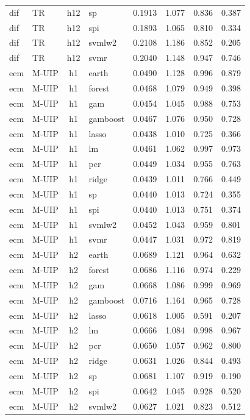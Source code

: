 \begin{ThreePartTable}
\begin{longtable}[t]{llclcccc}
dif & TR & h12 & sp & 0.1913 & 1.077 & 0.836 & 0.387\\
dif & TR & h12 & spi & 0.1893 & 1.065 & 0.810 & 0.334\\
dif & TR & h12 & svmlw2 & 0.2108 & 1.186 & 0.852 & 0.205\\
dif & TR & h12 & svmr & 0.2040 & 1.148 & 0.947 & 0.746\\
\addlinespace
ecm & M-UIP & h1 & earth & 0.0490 & 1.128 & 0.996 & 0.879\\
ecm & M-UIP & h1 & forest & 0.0468 & 1.079 & 0.949 & 0.398\\
ecm & M-UIP & h1 & gam & 0.0454 & 1.045 & 0.988 & 0.753\\
ecm & M-UIP & h1 & gamboost & 0.0467 & 1.076 & 0.950 & 0.728\\
ecm & M-UIP & h1 & lasso & 0.0438 & 1.010 & 0.725 & 0.366\\
ecm & M-UIP & h1 & lm & 0.0461 & 1.062 & 0.997 & 0.973\\
ecm & M-UIP & h1 & pcr & 0.0449 & 1.034 & 0.955 & 0.763\\
ecm & M-UIP & h1 & ridge & 0.0439 & 1.011 & 0.766 & 0.449\\
ecm & M-UIP & h1 & sp & 0.0440 & 1.013 & 0.724 & 0.355\\
ecm & M-UIP & h1 & spi & 0.0440 & 1.013 & 0.751 & 0.374\\
ecm & M-UIP & h1 & svmlw2 & 0.0452 & 1.043 & 0.959 & 0.801\\
ecm & M-UIP & h1 & svmr & 0.0447 & 1.031 & 0.972 & 0.819\\
\addlinespace
ecm & M-UIP & h2 & earth & 0.0689 & 1.121 & 0.964 & 0.632\\
ecm & M-UIP & h2 & forest & 0.0686 & 1.116 & 0.974 & 0.229\\
ecm & M-UIP & h2 & gam & 0.0668 & 1.086 & 0.999 & 0.969\\
ecm & M-UIP & h2 & gamboost & 0.0716 & 1.164 & 0.965 & 0.728\\
ecm & M-UIP & h2 & lasso & 0.0618 & 1.005 & 0.591 & 0.207\\
ecm & M-UIP & h2 & lm & 0.0666 & 1.084 & 0.998 & 0.967\\
ecm & M-UIP & h2 & pcr & 0.0650 & 1.057 & 0.962 & 0.800\\
ecm & M-UIP & h2 & ridge & 0.0631 & 1.026 & 0.844 & 0.493\\
ecm & M-UIP & h2 & sp & 0.0681 & 1.107 & 0.919 & 0.190\\
ecm & M-UIP & h2 & spi & 0.0642 & 1.045 & 0.928 & 0.520\\
ecm & M-UIP & h2 & svmlw2 & 0.0627 & 1.021 & 0.823 & 0.512\\

\end{longtable}
\end{ThreePartTable}
